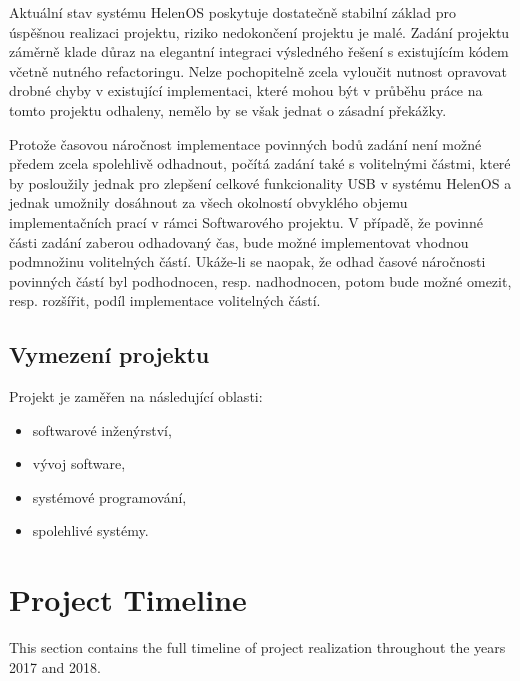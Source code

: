 Aktuální stav systému HelenOS poskytuje dostatečně stabilní základ pro úspěšnou realizaci
projektu, riziko nedokončení projektu je malé. Zadání projektu záměrně klade důraz na elegantní
integraci výsledného řešení s existujícím kódem včetně nutného refactoringu. Nelze pochopitelně
zcela vyloučit nutnost opravovat drobné chyby v existující implementaci, které mohou být
v průběhu práce na tomto projektu odhaleny, nemělo by se však jednat o zásadní překážky.

Protože časovou náročnost implementace povinných bodů zadání není možné předem zcela
spolehlivě odhadnout, počítá zadání také s volitelnými částmi, které by posloužily jednak pro
zlepšení celkové funkcionality USB v systému HelenOS a jednak umožnily dosáhnout za všech
okolností obvyklého objemu implementačních prací v rámci Softwarového projektu. V případě, že
povinné části zadání zaberou odhadovaný čas, bude možné implementovat vhodnou podmnožinu
volitelných částí. Ukáže-li se naopak, že odhad časové náročnosti povinných částí byl
podhodnocen, resp. nadhodnocen, potom bude možné omezit, resp. rozšířit, podíl implementace
volitelných částí.


\subsection{Vymezení projektu}

Projekt je zaměřen na následující oblasti:
~
\begin{itemize}
	\item softwarové inženýrství,
	\item vývoj software,
	\item systémové programování,
	\item spolehlivé systémy.
\end{itemize}


\section{Project Timeline}

This section contains the full timeline of project realization throughout the
years 2017 and 2018.

